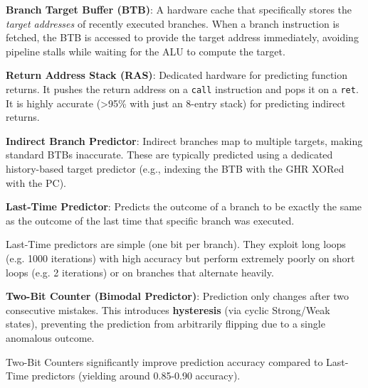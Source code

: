 \begin{definition}
    \textbf{Branch Target Buffer (BTB)}: A hardware cache that specifically stores the \textit{target addresses} of recently executed branches. When a branch instruction is fetched, the BTB is accessed to provide the target address immediately, avoiding pipeline stalls while waiting for the ALU to compute the target.
\end{definition}

\begin{definition}
    \textbf{Return Address Stack (RAS)}: Dedicated hardware for predicting function returns. It pushes the return address on a \texttt{call} instruction and pops it on a \texttt{ret}. It is highly accurate (>95\% with just an 8-entry stack) for predicting indirect returns.
\end{definition}

\begin{definition}
    \textbf{Indirect Branch Predictor}: Indirect branches map to multiple targets, making standard BTBs inaccurate. These are typically predicted using a dedicated history-based target predictor (e.g., indexing the BTB with the GHR XORed with the PC).
\end{definition}

\begin{definition}
    \textbf{Last-Time Predictor}: Predicts the outcome of a branch to be exactly the same as the outcome of the last time that specific branch was executed.
\end{definition}
\begin{remark}
    Last-Time predictors are simple (one bit per branch). They exploit long loops (e.g. 1000 iterations) with high accuracy but perform extremely poorly on short loops (e.g. 2 iterations) or on branches that alternate heavily.
\end{remark}

\begin{definition}
    \textbf{Two-Bit Counter (Bimodal Predictor)}: Prediction only changes after two consecutive mistakes. This introduces \textbf{hysteresis} (via cyclic Strong/Weak states), preventing the prediction from arbitrarily flipping due to a single anomalous outcome.
\end{definition}
\begin{remark}
    Two-Bit Counters significantly improve prediction accuracy compared to Last-Time predictors (yielding around 0.85-0.90 accuracy).
\end{remark}


